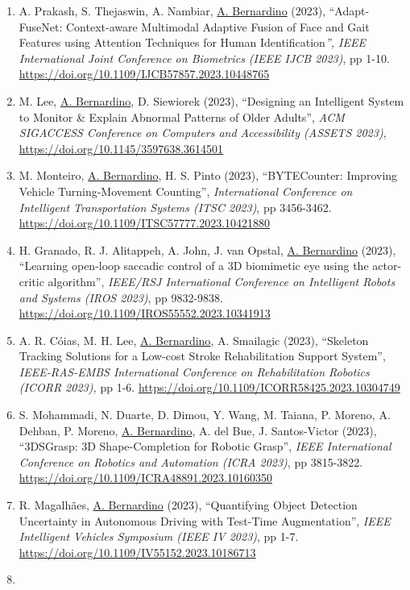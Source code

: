 \documentclass[
]{article}
\begin{document}
\begin{enumerate}
{  2022.} \url{https://doi.org/10.1007/978-3-031-37317-6_2}
\item
  A. Prakash, S. Thejaswin, A. Nambiar, \ul{A. Bernardino} (2023),
  ``Adapt-FuseNet: Context-aware Multimodal Adaptive Fusion of Face and
  Gait Features using Attention Techniques for Human
  Identification\emph{'', IEEE International Joint Conference on
  Biometrics (IEEE IJCB 2023)}, pp 1-10.
  \url{https://doi.org/10.1109/IJCB57857.2023.10448765}
\item
  M. Lee, \ul{A. Bernardino}, D. Siewiorek (2023), ``Designing an
  Intelligent System to Monitor \& Explain Abnormal Patterns of Older
  Adults'', \emph{ACM SIGACCESS Conference on Computers and
  Accessibility (ASSETS 2023)},
  \url{https://doi.org/10.1145/3597638.3614501}
\item
  M. Monteiro, \ul{A. Bernardino}, H. S. Pinto (2023), ``BYTECounter:
  Improving Vehicle Turning-Movement Counting'', \emph{International
  Conference on Intelligent Transportation Systems (ITSC 2023)}, pp
  3456-3462. \url{https://doi.org/10.1109/ITSC57777.2023.10421880}
\item
  H. Granado, R. J. Alitappeh, A. John, J. van Opstal, \ul{A.
  Bernardino} (2023), ``Learning open-loop saccadic control of a 3D
  biomimetic eye using the actor-critic algorithm'', \emph{IEEE/RSJ
  International Conference on Intelligent Robots and Systems (IROS
  2023)}, pp 9832-9838.
  \url{https://doi.org/10.1109/IROS55552.2023.10341913}
\item
  A. R. Cóias, M. H. Lee, \ul{A. Bernardino}, A. Smailagic (2023),
  ``Skeleton Tracking Solutions for a Low-cost Stroke Rehabilitation
  Support System'', \emph{IEEE-RAS-EMBS International Conference on
  Rehabilitation Robotics (ICORR 2023),} pp 1-6.
  \url{https://doi.org/10.1109/ICORR58425.2023.10304749}
\item
  S. Mohammadi, N. Duarte, D. Dimou, Y. Wang, M. Taiana, P. Moreno, A.
  Dehban, P. Moreno, \ul{A. Bernardino}, A. del Bue, J. Santos-Victor
  (2023), ``3DSGrasp: 3D Shape-Completion for Robotic Grasp'',
  \emph{IEEE International Conference on Robotics and Automation (ICRA
  2023)}, pp 3815-3822.
  \url{https://doi.org/10.1109/ICRA48891.2023.10160350}
\item
  R. Magalhães, \ul{A. Bernardino} (2023), ``Quantifying Object
  Detection Uncertainty in Autonomous Driving with Test-Time
  Augmentation'', \emph{IEEE Intelligent Vehicles Symposium (IEEE IV
  2023)}, pp 1-7. \url{https://doi.org/10.1109/IV55152.2023.10186713}
\item

\end{enumerate}
\end{document}
